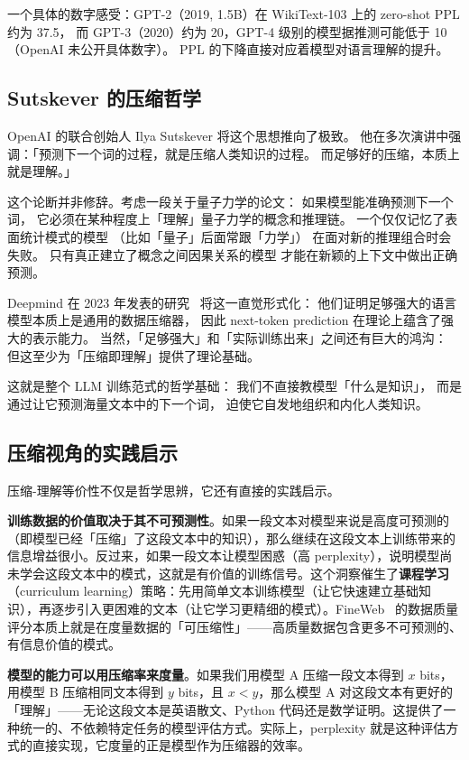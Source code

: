 一个具体的数字感受：GPT-2（2019, 1.5B）在 WikiText-103 上的 zero-shot PPL 约为 37.5，
而 GPT-3（2020）约为 20，GPT-4 级别的模型据推测可能低于 10（OpenAI 未公开具体数字）。
PPL 的下降直接对应着模型对语言理解的提升。

\subsection{Sutskever 的压缩哲学}

OpenAI 的联合创始人 Ilya Sutskever 将这个思想推向了极致。
他在多次演讲中强调：「预测下一个词的过程，就是压缩人类知识的过程。
而足够好的压缩，本质上就是理解。」

这个论断并非修辞。考虑一段关于量子力学的论文：
如果模型能准确预测下一个词，
它必须在某种程度上「理解」量子力学的概念和推理链。
一个仅仅记忆了表面统计模式的模型
（比如「量子」后面常跟「力学」）
在面对新的推理组合时会失败。
只有真正建立了概念之间因果关系的模型
才能在新颖的上下文中做出正确预测。

Deepmind 在 2023 年发表的研究~\cite{deletang2024language}
将这一直觉形式化：
他们证明足够强大的语言模型本质上是通用的数据压缩器，
因此 next-token prediction 在理论上蕴含了强大的表示能力。
当然，「足够强大」和「实际训练出来」之间还有巨大的鸿沟：
但这至少为「压缩即理解」提供了理论基础。

这就是整个 LLM 训练范式的哲学基础：
我们不直接教模型「什么是知识」，
而是通过让它预测海量文本中的下一个词，
迫使它自发地组织和内化人类知识。

\subsection{压缩视角的实践启示}

压缩-理解等价性不仅是哲学思辨，它还有直接的实践启示。

\textbf{训练数据的价值取决于其不可预测性}。如果一段文本对模型来说是高度可预测的（即模型已经「压缩」了这段文本中的知识），那么继续在这段文本上训练带来的信息增益很小。反过来，如果一段文本让模型困惑（高 perplexity），说明模型尚未学会这段文本中的模式，这就是有价值的训练信号。这个洞察催生了\textbf{课程学习}（curriculum learning）策略：先用简单文本训练模型（让它快速建立基础知识），再逐步引入更困难的文本（让它学习更精细的模式）。FineWeb~\cite{penedo2024fineweb} 的数据质量评分本质上就是在度量数据的「可压缩性」——高质量数据包含更多不可预测的、有信息价值的模式。

\textbf{模型的能力可以用压缩率来度量}。如果我们用模型 A 压缩一段文本得到 $x$ bits，用模型 B 压缩相同文本得到 $y$ bits，且 $x < y$，那么模型 A 对这段文本有更好的「理解」——无论这段文本是英语散文、Python 代码还是数学证明。这提供了一种统一的、不依赖特定任务的模型评估方式。实际上，perplexity 就是这种评估方式的直接实现，它度量的正是模型作为压缩器的效率。

